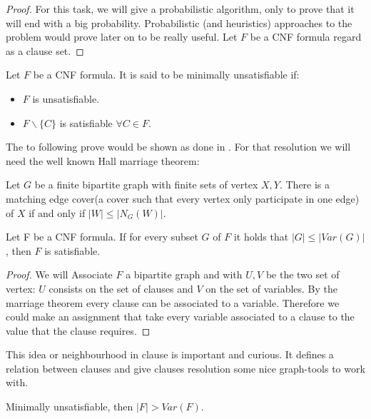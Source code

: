 \begin{proof}
For this task, we will give a probabilistic algorithm, only to prove that it will end with a big probability. Probabilistic (and heuristics) approaches to the problem would prove later on to be really useful. Let $F$ be a CNF formula regard as a clause set.
\end{proof}



\begin{definition}
Let $F$ be a CNF formula. It is said to be minimally unsatisfiable if:
\begin{itemize}
	\item $F$ is unsatisfiable.
	\item $F\backslash \{C\}$ is satisfiable $\forall C \in F$.
\end{itemize}
\end{definition}


The to following prove would be shown as done in \cite{schoning2013satisfiability}. For that resolution we will need the well known Hall marriage theorem\cite{hall2009representatives}:

\begin{theorem}
  Let $G$ be a finite bipartite graph with finite sets of vertex $X,Y$. There is a matching edge cover(a cover such that every vertex only participate in one edge) of $X$ if and only if $|W| \le |N_G(W)|$.  
\end{theorem}


\begin{lemma}
Let F be a CNF formula. If for every subset $G$ of $F$ it holds that $|G|\le |Var(G)|$, then $F$ is satisfiable.
\end{lemma}

\begin{proof}
 We will Associate $F$ a bipartite graph and with $U, V$ be the two set of vertex: $U$ consists on the set of clauses and $V$ on the set of variables. By the marriage theorem every clause can be associated to a variable. Therefore we could make an assignment that take every variable associated to a clause to the value that the clause requires.
\end{proof}

This idea or neighbourhood in clause is important and curious. It defines a relation between clauses and give clauses resolution some nice graph-tools to work with.


\begin{proposition}
	Minimally unsatisfiable, then $|F| > Var(F)$.
\end{proposition}

